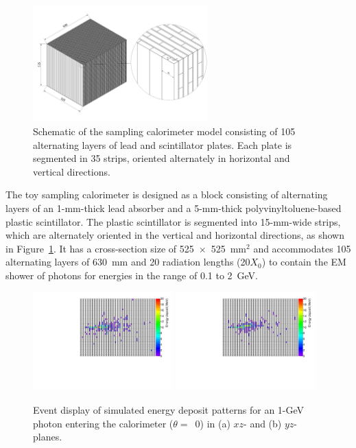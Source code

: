 \documentclass[12pt,times,draftclsnofoot,a4paper]{elsarticle}
\begin{document}
\begin{figure}[!hbt]
\centering
\includegraphics[width=0.6\textwidth]{Fig1_detector_schematic.jpeg}
\caption{ Schematic of the sampling calorimeter model consisting of 105 alternating layers of lead and scintillator plates. Each plate is segmented in 35 strips, oriented alternately in horizontal and vertical directions. }
\label{fig:det_conf}
\end{figure}

The toy sampling calorimeter is designed as a block consisting of alternating layers of an 1-mm-thick lead absorber and a 5-mm-thick polyvinyltoluene-based plastic scintillator. The plastic scintillator is segmented into 15-mm-wide strips, which are alternately oriented in the vertical and horizontal directions, as shown in Figure~\ref{fig:det_conf}. It has a cross-section size of 525~$\times$~525~mm$^{2}$ and accommodates 105 alternating layers of 630~mm and 20 radiation lengths (20$X_{0}$) to contain the EM shower of photons for energies in the range of 0.1 to 2~GeV.

\begin{figure}[!hbt]
\centering
\includegraphics[width=0.48\textwidth]{Fig2_EMShower_XZ.pdf}
\includegraphics[width=0.48\textwidth]{Fig2_EMShower_YZ.pdf}
\caption{ Event display of simulated energy deposit patterns for an 1-GeV photon entering the calorimeter ($\theta=$~0) in (a) $xz$- and (b) $yz$-planes.}
\label{fig:Evt_Dis}
\end{figure}
\end{document}
